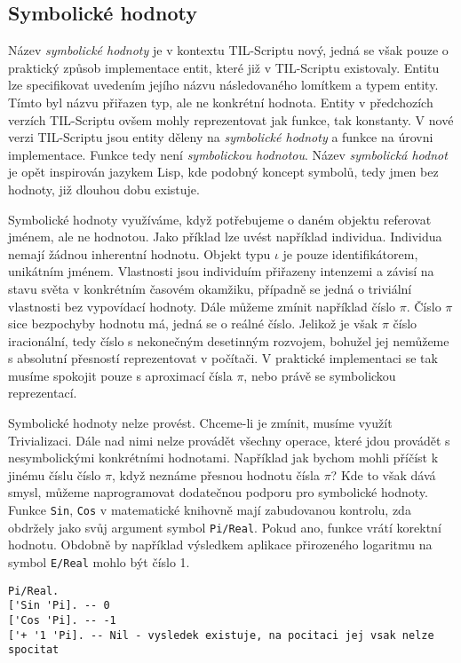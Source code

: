 \subsection{Symbolické hodnoty} \label{symbolic-values}

Název \textit{symbolické hodnoty} je v kontextu TIL-Scriptu nový, jedná se však pouze o praktický
způsob implementace entit, které již v TIL-Scriptu existovaly. Entitu lze specifikovat uvedením
jejího názvu následovaného lomítkem a typem entity. Tímto byl názvu přiřazen typ, ale ne konkrétní
hodnota. Entity v předchozích verzích TIL-Scriptu ovšem mohly reprezentovat jak funkce, tak
konstanty. V nové verzi TIL-Scriptu jsou entity děleny na \textit{symbolické hodnoty} a funkce
na úrovni implementace. Funkce tedy není \textit{symbolickou hodnotou}. Název
\textit{symbolická hodnot} je opět inspirován jazykem Lisp, kde podobný koncept symbolů, tedy jmen
bez hodnoty, již dlouhou dobu existuje.

Symbolické hodnoty využíváme, když potřebujeme o daném objektu referovat jménem, ale ne hodnotou.
Jako příklad lze uvést například individua. Individua nemají žádnou inherentní hodnotu. Objekt
typu $\iota$ je pouze identifikátorem, unikátním jménem. Vlastnosti jsou individuím přiřazeny
intenzemi a závisí na stavu světa v konkrétním časovém okamžiku, případně se jedná o triviální
vlastnosti bez vypovídací hodnoty. Dále můžeme zmínit například číslo $\pi$. Číslo $\pi$ sice
bezpochyby hodnotu má, jedná se o reálné číslo. Jelikož je však $\pi$ číslo iracionální, tedy číslo
s nekonečným desetinným rozvojem, bohužel jej nemůžeme s absolutní přesností reprezentovat
v počítači. V praktické implementaci se tak musíme spokojit pouze s aproximací čísla $\pi$, nebo
právě se symbolickou reprezentací.

Symbolické hodnoty nelze provést. Chceme-li je zmínit, musíme využít Trivializaci. Dále nad nimi
nelze provádět všechny operace, které jdou provádět s nesymbolickými konkrétními hodnotami.
Například jak bychom mohli příčíst k jinému číslu číslo $\pi$, když neznáme přesnou hodnotu čísla
$\pi$? Kde to však dává smysl, můžeme naprogramovat dodatečnou podporu pro symbolické hodnoty.
Funkce \lstinline{Sin}, \lstinline{Cos} v matematické knihovně mají zabudovanou kontrolu, zda
obdržely jako svůj argument symbol \lstinline{Pi/Real}. Pokud ano, funkce vrátí korektní
hodnotu. Obdobně by například výsledkem aplikace přirozeného logaritmu na symbol \lstinline{E/Real}
mohlo být číslo 1.

\begin{lstlisting}[caption={Příklad využití symbolických hodnot}]
Pi/Real.
['Sin 'Pi]. -- 0
['Cos 'Pi]. -- -1
['+ '1 'Pi]. -- Nil - vysledek existuje, na pocitaci jej vsak nelze spocitat
\end{lstlisting}

